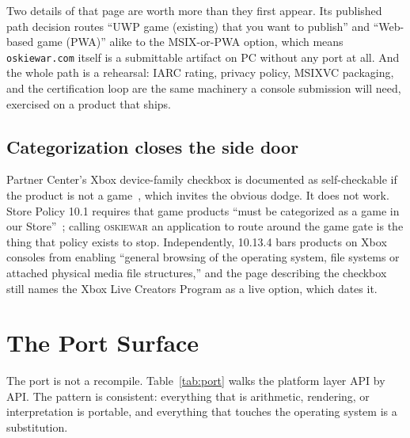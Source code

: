 \documentclass[10pt,letterpaper,twocolumn]{article}
\newcommand{\game}{\textsc{oskiewar}}
\newcommand{\code}[1]{\texttt{#1}}
\begin{document}
Two details of that page are worth more than they first appear. Its published path decision routes ``UWP game (existing) that you want to publish'' and ``Web-based game (PWA)'' alike to the MSIX-or-PWA option, which means \code{oskiewar.com} itself is a submittable artifact on PC without any port at all. And the whole path is a rehearsal: IARC rating, privacy policy, MSIXVC packaging, and the certification loop are the same machinery a console submission will need, exercised on a product that ships.

\subsection{Categorization closes the side door}

Partner Center's Xbox device-family checkbox is documented as self-checkable if the product is not a game~\cite{msUploadPackages}, which invites the obvious dodge. It does not work. Store Policy 10.1 requires that game products ``must be categorized as a game in our Store''~\cite{msStorePolicies}; calling \game{} an application to route around the game gate is the thing that policy exists to stop. Independently, 10.13.4 bars products on Xbox consoles from enabling ``general browsing of the operating system, file systems or attached physical media file structures,'' and the page describing the checkbox still names the Xbox Live Creators Program as a live option, which dates it.

\section{The Port Surface}

The port is not a recompile. Table~\ref{tab:port} walks the platform layer API by API. The pattern is consistent: everything that is arithmetic, rendering, or interpretation is portable, and everything that touches the operating system is a substitution.
\end{document}
